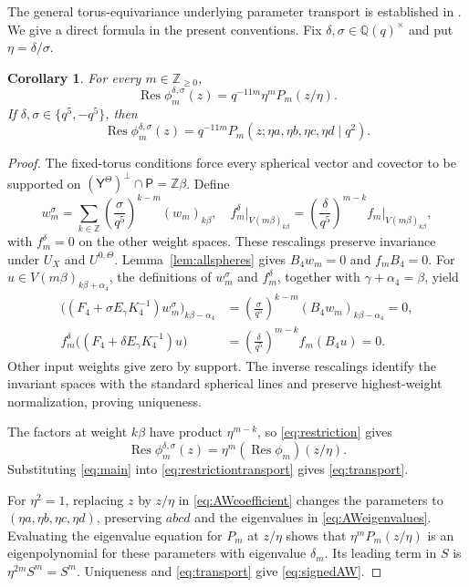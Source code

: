 \documentclass[12pt,reqno]{amsart}
\theoremstyle{plain}
\newtheorem{corollary}[theorem]{Corollary}
\theoremstyle{definition}
\numberwithin{equation}{section}
\newcommand{\kk}{\mathbb Q(q)}
\newcommand{\Res}{\operatorname{Res}}
\begin{document}
The general torus-equivariance underlying parameter transport is
established in \cite[Theorem~6.3]{Let03}.
We give a direct formula in the present conventions.
Fix $\delta,\sigma\in\kk^\times$ and put $\eta=\delta/\sigma$.

\begin{corollary}\label{cor:transport}
For every $m\in\mathbb Z_{\geq0}$,
\begin{equation}\label{eq:transport}
 \Res\phi_m^{\delta,\sigma}(z)
 =q^{-11m}\eta^mP_m(z/\eta).
\end{equation}
If $\delta,\sigma\in\{q^5,-q^5\}$, then
\begin{equation}\label{eq:signedAW}
 \Res\phi_m^{\delta,\sigma}(z)
 =q^{-11m}P_m(z;\eta a,\eta b,\eta c,\eta d\mid q^2).
\end{equation}
\end{corollary}
\begin{proof}
	The fixed-torus conditions force every spherical vector and covector
	to be supported on
	$(\mathsf Y^\Theta)^\perp\cap\mathsf P=\mathbb Z\beta$.
	Define
	\[
	w_m^\sigma
	=\sum_{k\in\mathbb Z}
	\left(\frac{\sigma}{q^5}\right)^{k-m}(w_m)_{k\beta},
	\quad
	f_m^\delta\big|_{V(m\beta)_{k\beta}}
	=\left(\frac{\delta}{q^5}\right)^{m-k}
	f_m\big|_{V(m\beta)_{k\beta}},
	\]
	with $f_m^\delta=0$ on the other weight spaces.
	These rescalings preserve invariance under $U_X$ and
	$U^{0,\Theta}$.
	Lemma~\ref{lem:allspheres} gives $B_4w_m=0$ and $f_mB_4=0$.
	For $u\in V(m\beta)_{k\beta+\alpha_4}$, the definitions of
	$w_m^\sigma$ and $f_m^\delta$, together with
	$\gamma+\alpha_4=\beta$, yield
	\begin{align*}
		\bigl((F_4+\sigma E_\gamma K_4^{-1})w_m^\sigma\bigr)_{k\beta-\alpha_4}
		&=\left(\frac{\sigma}{q^5}\right)^{k-m}
		(B_4w_m)_{k\beta-\alpha_4}=0,\\
		f_m^\delta\bigl((F_4+\delta E_\gamma K_4^{-1})u\bigr)
		&=\left(\frac{\delta}{q^5}\right)^{m-k}f_m(B_4u)=0.
	\end{align*}
	Other input weights give zero by support.
	The inverse rescalings identify the invariant spaces with the
	standard spherical lines and preserve highest-weight normalization,
	proving uniqueness.
	
	The factors at weight $k\beta$ have product $\eta^{m-k}$, so
	\eqref{eq:restriction} gives
	\begin{equation}\label{eq:restrictiontransport}
	\Res\phi_m^{\delta,\sigma}(z)
	=\eta^m(\Res\phi_m)(z/\eta).
	\end{equation}
Substituting \eqref{eq:main} into \eqref{eq:restrictiontransport} gives
\eqref{eq:transport}. 
	
	For $\eta^2=1$, replacing $z$ by $z/\eta$ in
	\eqref{eq:AWcoefficient} changes the parameters to
	$(\eta a,\eta b,\eta c,\eta d)$, preserving $abcd$ and the
	eigenvalues in \eqref{eq:AWeigenvalues}.
	Evaluating the eigenvalue equation for $P_m$ at $z/\eta$
	shows that $\eta^mP_m(z/\eta)$ is an eigenpolynomial for these
	parameters with eigenvalue $\delta_m$.
	Its leading term in $S$ is $\eta^{2m}S^m=S^m$.
	Uniqueness and \eqref{eq:transport} give \eqref{eq:signedAW}.
\end{proof}
\end{document}
